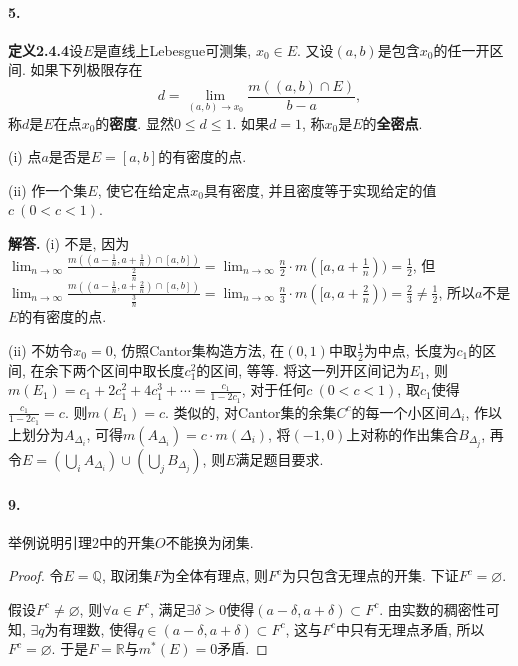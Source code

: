 \documentclass[12pt, a4paper, oneside]{ctexart}
\newenvironment{solution}{\par\noindent\textbf{解答. }}{\bigskip\par}
\def\bd{\boldsymbol}    %
\def\R{\mathbb{R}}      %
\def\add{\vspace{0.5ex}}  %
\def\del{\vspace{-2.5ex}}  %
\begin{document}
\paragraph{5.}\textbf{定义2.4.4}设$E$是直线上Lebesgue可测集, $x_0\in E$. 又设$(a, b)$是包含$x_0$的任一开区间. 如果下列极限存在
\begin{equation*}
    d = \lim_{(a, b)\to x_0}\frac{m((a, b)\cap E)}{b-a},
\end{equation*}
称$d$是$E$在点$x_0$的\textbf{密度}. 显然$0\leqslant d\leqslant 1$. 如果$d=1$, 称$x_0$是$E$的\textbf{全密点}.

(i) 点$a$是否是$E=[a, b]$的有密度的点.

(ii) 作一个集$E$, 使它在给定点$x_0$具有密度, 并且密度等于实现给定的值$c\ (0 < c < 1)$.\add
\begin{solution}
    (i) 不是, 因为$\lim_{n\to\infty}\frac{m((a-\frac{1}{n}, a+\frac{1}{n})\cap[a,b])}{\frac{2}{n}} = \lim_{n\to\infty}\frac{n}{2}\cdot m([a, a+\frac{1}{n})) = \frac{1}{2}$, 但\\$\lim_{n\to\infty}\frac{m((a-\frac{1}{n}, a+\frac{2}{n})\cap[a,b])}{\frac{3}{n}} = \lim_{n\to\infty}\frac{n}{3}\cdot m([a, a+\frac{2}{n})) = \frac{2}{3}\neq \frac{1}{2}$, 所以$a$不是$E$的有密度的点.

    (ii) 不妨令$x_0 = 0$, 仿照Cantor集构造方法, 在$(0, 1)$中取$\frac{1}{2}$为中点, 长度为$c_1$的区间, 在余下两个区间中取长度$c_1^2$的区间, 等等. 将这一列开区间记为$E_1$, 则$m(E_1) = c_1+2c_1^2+4c_1^3+\cdots=\frac{c_1}{1-2c_1}$, 对于任何$c\ (0 < c <1)$, 取$c_1$使得$\frac{c_1}{1-2c_1} = c$. 则$m(E_1) = c$. 类似的, 对Cantor集的余集$C^c$的每一个小区间$\Delta_i$, 作以上划分为$A_{\Delta_i}$, 可得$m(A_{\Delta_i}) = c\cdot m(\Delta_i)$, 将$(-1,0)$上对称的作出集合$B_{\Delta_j}$, 再令$E = \left(\bigcup_{i}A_{\Delta_i}\right)\cup\left(\bigcup_{j}B_{\Delta_j}\right)$, 则$E$满足题目要求.
\end{solution}\del
\paragraph{9.}举例说明引理$2$中的开集$O$不能换为闭集.
\begin{proof}
    令$E=\mathbb{Q}$, 取闭集$F$为全体有理点, 则$F^c$为只包含无理点的开集. 下证$F^c=\varnothing$.
    
    假设$F^c\neq \varnothing$, 则$\forall a\in F^c$, 满足$\exists \delta > 0$使得$(a-\delta, a + \delta)\subset F^c$. 由实数的稠密性可知, $\exists q$为有理数, 使得$q \in (a-\delta, a+\delta) \subset F^c$, 这与$F^c$中只有无理点矛盾, 所以$F^c = \varnothing$. 于是$F = \R$与$m^*(E) = 0$矛盾.
\end{proof}
\def\O{\bd{O}}
\def\F{\bd{F}}
\end{document}
